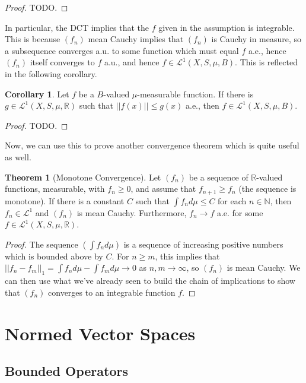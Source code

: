 \documentclass[11pt, oneside]{amsart}   	%
\theoremstyle{definition}
\newtheorem{theorem}{Theorem}[section]
\newtheorem{corollary}{Corollary}[theorem]
\begin{document}
	\begin{proof}
		TODO.
	\end{proof}
	
	In particular, the DCT implies that the $f$ given in the assumption is integrable. This is because $(f_n)$ mean Cauchy 
	implies that $(f_n)$ is Cauchy in measure, so a subsequence converges a.u. to some function which must equal $f$ 
	a.e., hence $(f_n)$ itself converges to $f$ a.u., and hence $f\in\mathcal L^1(X, S, \mu, B)$. This is reflected in the 
	following corollary.
	
	\begin{corollary}
		Let $f$ be a $B$-valued $\mu$-measurable function. If there is $g\in\mathcal L^1(X, S, \mu, \mathbb R)$ such that 
		$||f(x)||\leq g(x)$ a.e., then $f\in\mathcal L^1(X, S, \mu, B)$. 
	\end{corollary}
	
	\begin{proof}
		TODO.
	\end{proof}
	
	Now, we can use this to prove another convergence theorem which is quite useful as well.
	
	\begin{theorem}[Monotone Convergence]
		Let $(f_n)$ be a sequence of $\mathbb R$-valued functions, measurable, with $f_n\geq 0$, and assume that 
		$f_{n + 1}\geq f_n$ (the sequence is monotone). If there is a constant $C$ such that $\int f_nd\mu\leq C$ 
		for each $n\in\mathbb N$, then $f_n\in\mathcal L^1$ and $(f_n)$ is mean Cauchy. Furthermore, $f_n\rightarrow f$
		a.e. for some $f\in\mathcal L^1(X, S, \mu, \mathbb R)$. 
	\end{theorem}
	
	\begin{proof}
		The sequence $(\int f_nd\mu)$ is a sequence of increasing positive numbers which is bounded above by $C$. 
		For $n\geq m$, this implies that $||f_n - f_m||_1 = \int f_nd\mu - \int f_md\mu\rightarrow 0$ as $n, m\rightarrow
		\infty$, so $(f_n)$ is mean Cauchy. We can then use what we've already seen to build the chain of implications 
		to show that $(f_n)$ converges to an integrable function $f$. 
	\end{proof}
	
	\section{Normed Vector Spaces}
	
	\subsection{Bounded Operators}
	
\end{document}
